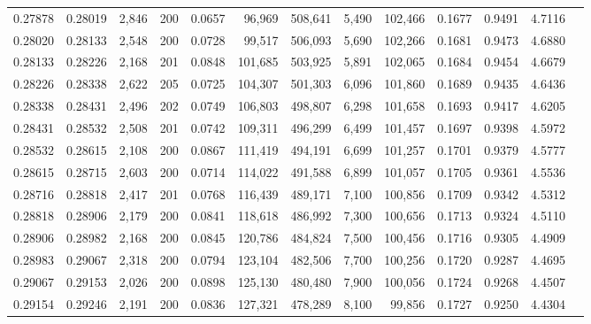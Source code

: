 \begin{tabular}{rrrrrrrrrrrrr}
0.27878 & 0.28019 & 2,846 & 200 &                                     0.0657 &  96,969 & 508,641 &   5,490 & 102,466 & 0.1677 & 0.9491 & 4.7116 \\
0.28020 & 0.28133 & 2,548 & 200 &                                     0.0728 &  99,517 & 506,093 &   5,690 & 102,266 & 0.1681 & 0.9473 & 4.6880 \\
0.28133 & 0.28226 & 2,168 & 201 &                                     0.0848 & 101,685 & 503,925 &   5,891 & 102,065 & 0.1684 & 0.9454 & 4.6679 \\
0.28226 & 0.28338 & 2,622 & 205 &                                     0.0725 & 104,307 & 501,303 &   6,096 & 101,860 & 0.1689 & 0.9435 & 4.6436 \\
0.28338 & 0.28431 & 2,496 & 202 &                                     0.0749 & 106,803 & 498,807 &   6,298 & 101,658 & 0.1693 & 0.9417 & 4.6205 \\
0.28431 & 0.28532 & 2,508 & 201 &                                     0.0742 & 109,311 & 496,299 &   6,499 & 101,457 & 0.1697 & 0.9398 & 4.5972 \\
0.28532 & 0.28615 & 2,108 & 200 &                                     0.0867 & 111,419 & 494,191 &   6,699 & 101,257 & 0.1701 & 0.9379 & 4.5777 \\
0.28615 & 0.28715 & 2,603 & 200 &                                     0.0714 & 114,022 & 491,588 &   6,899 & 101,057 & 0.1705 & 0.9361 & 4.5536 \\
0.28716 & 0.28818 & 2,417 & 201 &                                     0.0768 & 116,439 & 489,171 &   7,100 & 100,856 & 0.1709 & 0.9342 & 4.5312 \\
0.28818 & 0.28906 & 2,179 & 200 &                                     0.0841 & 118,618 & 486,992 &   7,300 & 100,656 & 0.1713 & 0.9324 & 4.5110 \\
0.28906 & 0.28982 & 2,168 & 200 &                                     0.0845 & 120,786 & 484,824 &   7,500 & 100,456 & 0.1716 & 0.9305 & 4.4909 \\
0.28983 & 0.29067 & 2,318 & 200 &                                     0.0794 & 123,104 & 482,506 &   7,700 & 100,256 & 0.1720 & 0.9287 & 4.4695 \\
0.29067 & 0.29153 & 2,026 & 200 &                                     0.0898 & 125,130 & 480,480 &   7,900 & 100,056 & 0.1724 & 0.9268 & 4.4507 \\
0.29154 & 0.29246 & 2,191 & 200 &                                     0.0836 & 127,321 & 478,289 &   8,100 &  99,856 & 0.1727 & 0.9250 & 4.4304 \\

\end{tabular}
